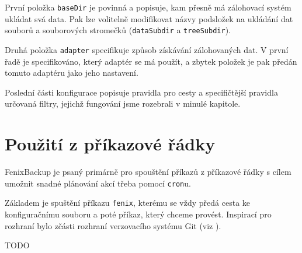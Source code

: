 První položka \texttt{baseDir} je povinná a popisuje, kam přesně má zálohovací
systém ukládat svá data. Pak lze volitelně modifikovat názvy podsložek na
ukládání dat souborů a souborových stromečků (\texttt{dataSubdir}
a \texttt{treeSubdir}).

Druhá položka \texttt{adapter} specifikuje způsob získávání zálohovaných dat.
V první řadě je specifikováno, který adaptér se má použít, a zbytek položek je
pak předán tomuto adaptéru jako jeho nastavení.

Poslední části konfigurace popisuje pravidla pro cesty a specifičtější pravidla
určovaná filtry, jejichž fungování jsme rozebrali v minulé kapitole.

\section{Použití z příkazové řádky}

FenixBackup je psaný primárně pro spouštění příkazů z příkazové řádky s cílem
umožnit snadné plánování akcí třeba pomocí \texttt{cron}u.

Základem je spuštění příkazu \texttt{fenix}, kterému se vždy předá cesta ke
konfiguračnímu souboru a poté příkaz, který chceme provést. Inspirací pro
rozhraní bylo zčásti rozhraní verzovacího systému Git (viz \cite{progit}).

TODO

